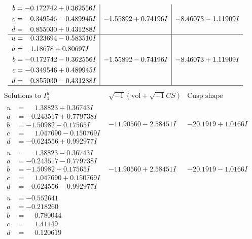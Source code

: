 \documentclass[1p]{elsarticle_modified}
\theoremstyle{definition}
\newcommand{\I}{\sqrt{-1}}
\begin{document}
$$\begin{array}{c|c|c}
\begin{aligned}
b &= -0.172742 + 0.362556 I \\
c &= -0.349546 - 0.489945 I \\
d &= \phantom{-}0.855030 + 0.431288 I\end{aligned}
 & -1.55892 + 0.74196 I & -8.46073 - 1.11909 I \\ \hline\begin{aligned}
u &= \phantom{-}0.323694 - 0.583510 I \\
a &= \phantom{-}1.18678 + 0.80697 I \\
b &= -0.172742 - 0.362556 I \\
c &= -0.349546 + 0.489945 I \\
d &= \phantom{-}0.855030 - 0.431288 I\end{aligned}
 & -1.55892 - 0.74196 I & -8.46073 + 1.11909 I\\
 \hline 
 \end{array}$$\newpage$$\begin{array}{c|c|c}  
\text{Solutions to }I^u_{4}& \I (\text{vol} + \sqrt{-1}CS) & \text{Cusp shape}\\
 \hline 
\begin{aligned}
u &= \phantom{-}1.38823 + 0.36743 I \\
a &= -0.243517 + 0.779738 I \\
b &= -1.50982 - 0.17565 I \\
c &= \phantom{-}1.047690 - 0.150769 I \\
d &= -0.624556 + 0.992977 I\end{aligned}
 & -11.90560 - 2.58451 I & -20.1919 + 1.0166 I \\ \hline\begin{aligned}
u &= \phantom{-}1.38823 - 0.36743 I \\
a &= -0.243517 - 0.779738 I \\
b &= -1.50982 + 0.17565 I \\
c &= \phantom{-}1.047690 + 0.150769 I \\
d &= -0.624556 - 0.992977 I\end{aligned}
 & -11.90560 + 2.58451 I & -20.1919 - 1.0166 I \\ \hline\begin{aligned}
u &= -0.552641\phantom{ +0.000000I} \\
a &= -0.218260\phantom{ +0.000000I} \\
b &= \phantom{-}0.780044\phantom{ +0.000000I} \\
c &= \phantom{-}1.41149\phantom{ +0.000000I} \\
d &= \phantom{-}0.120619\phantom{ +0.000000I}\end{aligned}

\end{array}$$
\end{document}

